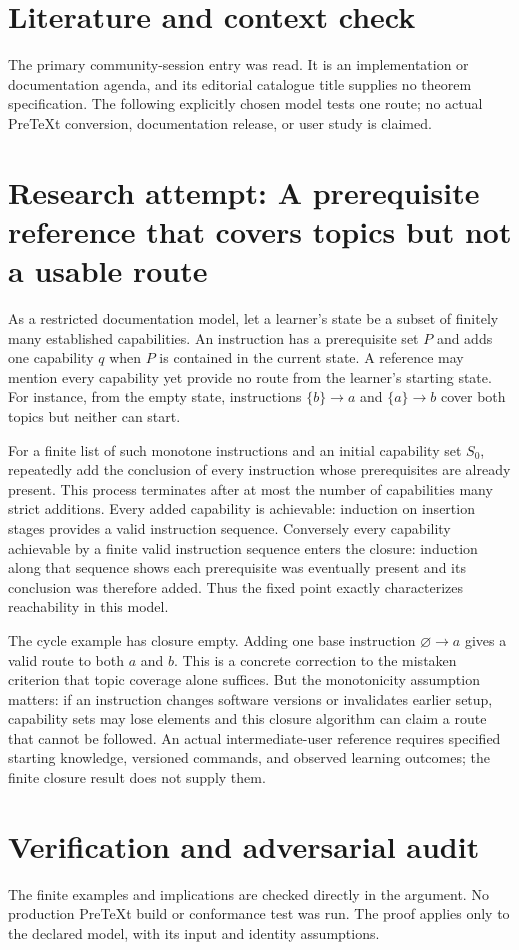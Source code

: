 \documentclass[11pt]{article}
\begin{document}
\section{Literature and context check}
The primary community-session entry was read. It is an implementation or documentation agenda, and its editorial catalogue title supplies no theorem specification. The following explicitly chosen model tests one route; no actual PreTeXt conversion, documentation release, or user study is claimed.
\section{Research attempt: A prerequisite reference that covers topics but not a usable route}
As a restricted documentation model, let a learner's state be a subset of finitely many established capabilities. An instruction has a prerequisite set $P$ and adds one capability $q$ when $P$ is contained in the current state. A reference may mention every capability yet provide no route from the learner's starting state. For instance, from the empty state, instructions $\{b\}\to a$ and $\{a\}\to b$ cover both topics but neither can start.

For a finite list of such monotone instructions and an initial capability set $S_0$, repeatedly add the conclusion of every instruction whose prerequisites are already present. This process terminates after at most the number of capabilities many strict additions. Every added capability is achievable: induction on insertion stages provides a valid instruction sequence. Conversely every capability achievable by a finite valid instruction sequence enters the closure: induction along that sequence shows each prerequisite was eventually present and its conclusion was therefore added. Thus the fixed point exactly characterizes reachability in this model.

The cycle example has closure empty. Adding one base instruction $\varnothing\to a$ gives a valid route to both $a$ and $b$. This is a concrete correction to the mistaken criterion that topic coverage alone suffices. But the monotonicity assumption matters: if an instruction changes software versions or invalidates earlier setup, capability sets may lose elements and this closure algorithm can claim a route that cannot be followed. An actual intermediate-user reference requires specified starting knowledge, versioned commands, and observed learning outcomes; the finite closure result does not supply them.
\section{Verification and adversarial audit}
The finite examples and implications are checked directly in the argument. No production PreTeXt build or conformance test was run. The proof applies only to the declared model, with its input and identity assumptions.
\end{document}
